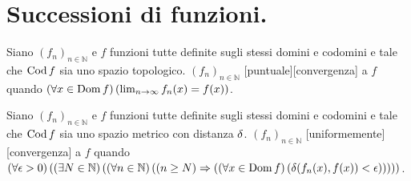 \section{Successioni di funzioni.}
\label{AnalisiFunzionale_SuccessioniDiFunzioni}
\begin{Definition}
	Siano $(f_n)_{n \in \mathbb{N}}$ e $f$ funzioni tutte definite sugli stessi domini e codomini e tale che $\operatorname{Cod}{f}$ sia uno spazio topologico. $(f_n)_{n \in \mathbb{N}}$ [puntuale][convergenza] a $f$ quando $\left ( \forall x \in \operatorname{Dom}{f} \right ) \left ( \lim_{n \rightarrow \infty} f_n(x) = f(x) \right )$.
\end{Definition}
\begin{Definition}
	Siano $(f_n)_{n \in \mathbb{N}}$ e $f$ funzioni tutte definite sugli stessi domini e codomini e tale che $\operatorname{Cod}{f}$ sia uno spazio metrico con distanza $\delta$. $(f_n)_{n \in \mathbb{N}}$ [uniformemente][convergenza] a $f$ quando $\left ( \forall \epsilon > 0 \right ) \left ( \left ( \exists N \in \mathbb{N} \right ) \left ( \left ( \forall n \in \mathbb{N} \right ) \left ( \left ( n \geq N \right ) \Rightarrow \left ( \left ( \forall x \in \operatorname{Dom}{f} \right ) \left ( \delta(f_n(x),f(x)) < \epsilon \right ) \right ) \right ) \right ) \right )$.
\end{Definition}
